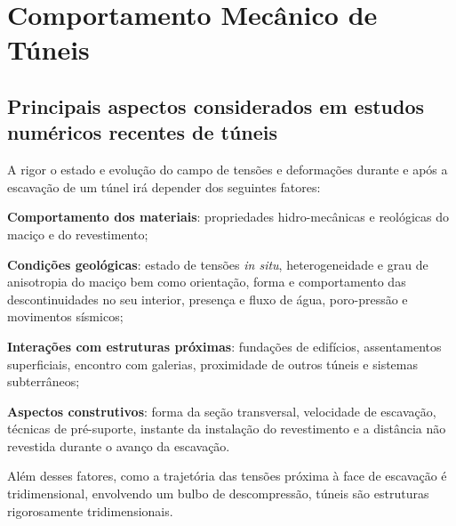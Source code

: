 \chapter{Comportamento Mecânico de Túneis}
\section{Principais aspectos considerados em estudos numéricos recentes de túneis}

A rigor o estado e evolução do campo de tensões e deformações durante e após a escavação de um túnel irá depender dos seguintes fatores:

\begin{alineas}
	
	\item \textbf{Comportamento dos materiais}: propriedades hidro-mecânicas e reológicas do maciço e do revestimento;
	
	\item \textbf{Condições geológicas}: estado de tensões \textit{in situ}, heterogeneidade e grau de anisotropia do maciço bem como orientação, forma e comportamento das descontinuidades no seu interior, presença e fluxo de água, poro-pressão e movimentos sísmicos;
	
	\item \textbf{Interações com estruturas próximas}: fundações de edifícios, assentamentos superficiais, encontro com galerias, proximidade de outros túneis e sistemas subterrâneos;
	
	\item \textbf{Aspectos construtivos}: forma da seção transversal, velocidade de escavação, técnicas de pré-suporte, instante da instalação do revestimento e a distância não revestida durante o avanço da escavação.
	
\end{alineas}

Além desses fatores, como a trajetória das tensões próxima à face de escavação é tridimensional, envolvendo um bulbo de descompressão, túneis são estruturas rigorosamente tridimensionais.

